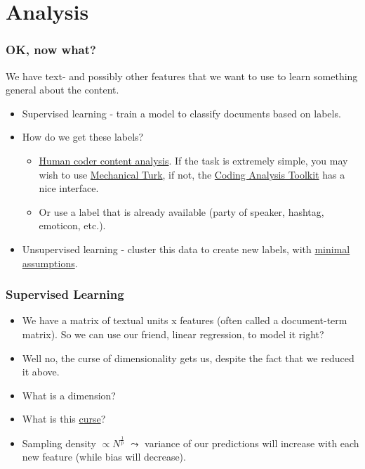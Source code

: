 \documentclass[]{beamer}
\begin{document}
\section{Analysis}
\setcounter{subsection}{1}

\begin{frame}
  \frametitle{OK, now what?}   %
We have text- and possibly other features that we want to use to learn something general about the content.
  \begin{itemize}
  \item Supervised learning - train a model to classify documents based on labels.
  \item How do we get these labels?  
    \begin{itemize}
    \item \href{http://academic.csuohio.edu/kneuendorf/content/}{Human coder content analysis}.  If the task is extremely simple, you may wish to use \href{https://www.mturk.com/}{\color{blue} Mechanical Turk}, if not, the \href{http://cat.ucsur.pitt.edu/}{\color{blue} Coding Analysis Toolkit} has a nice interface. 
    \item Or use a label that is already available (party of speaker, hashtag, emoticon, etc.). 
  \end{itemize}
  \item Unsupervised learning - cluster this data to create new labels, with \href{http://www.law.berkeley.edu/files/TopicModel.pdf}{\color{blue} minimal assumptions}.
  \end{itemize}
\end{frame}

\begin{frame}
  \frametitle{Supervised Learning}   %
  \begin{itemize}
  \item We have a matrix of textual units x features (often called a document-term matrix).  So we can use our friend, linear regression, to model it right?
  \item Well no, the curse of dimensionality gets us, despite the fact that we reduced it above.  
  \item What is a dimension? 
  \item What is this \href{http://www.quora.com/What-is-the-curse-of-dimensionality}{\color{blue} curse}? 
  \item Sampling density $\propto N^{\frac{1}{p}}$ $\leadsto$ variance of our predictions will increase with each new feature (while bias will decrease).
  \end{itemize}
\end{frame}
\end{document}

